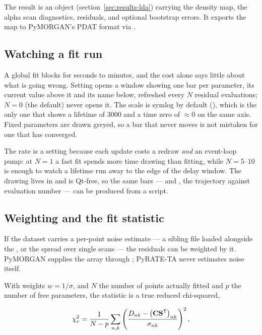The result is an  object (section~\ref{sec:results-lda})
carrying the density map, the alpha scan diagnostics, residuals, and optional
bootstrap errors. It exports the map to PyMORGAN's PDAT format via
.

\subsection{Watching a fit run}\label{sec:monitor}

A global fit blocks for seconds to minutes, and the cost alone says little
about what is going wrong. Setting  opens a
window showing one bar per parameter, its current value above it and its name
below, refreshed every $N$ residual evaluations; $N = 0$ (the default) never
opens it. The scale is symlog by default
(), which is the only one that shows a lifetime of
3000 and a time zero of $\approx 0$ on the same axis. Fixed parameters are drawn
greyed, so a bar that never moves is not mistaken for one that has converged.

The rate is a setting because each update costs a redraw \emph{and} an
event-loop pump: at $N = 1$ a fast fit spends more time drawing than fitting,
while $N = 5$--$10$ is enough to watch a lifetime run away to the edge of the
delay window. The drawing lives in  and is Qt-free, so
the same bars --- and , the trajectory against
evaluation number --- can be produced from a script.

\subsection{Weighting and the fit statistic}\label{sec:weights}

If the dataset carries a per-point noise estimate --- a sibling 
file loaded alongside the , or the spread over single scans --- the
residuals can be weighted by it. PyMORGAN supplies the array through
; PyRATE-TA never estimates noise itself.

With weights $w = 1/\sigma$, and $N$ the number of points actually fitted and
$p$ the number of free parameters, the statistic is a true reduced
chi-squared,

\begin{equation}
  \chi^{2}_{\nu} = \frac{1}{N-p}\sum_{n,k}
    \left(\frac{D_{nk} - \left(\mathbf{C}\mathbf{S}^{\mathsf{T}}\right)_{nk}}{\sigma_{nk}}\right)^{2},
  \label{eq:chi2red}
\end{equation}

